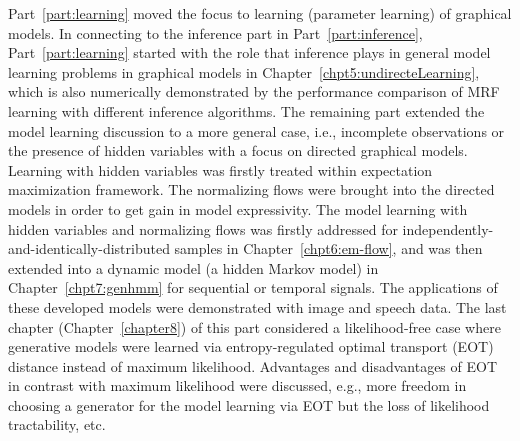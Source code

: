 Part~\ref{part:learning} moved the focus to learning (parameter learning) of graphical models. In connecting to the inference part in Part~\ref{part:inference}, Part~\ref{part:learning} started with the role that inference plays in general model learning problems in graphical models in Chapter~\ref{chpt5:undirecteLearning}, which is also numerically demonstrated by the performance comparison of MRF learning with different inference algorithms. The remaining part extended the model learning discussion to a more general case, i.e., incomplete observations or the presence of hidden variables with a focus on directed graphical models. Learning with hidden variables was firstly treated within expectation maximization framework. The normalizing flows were brought into the directed models in order to get gain in model expressivity. The model learning with hidden variables and normalizing flows was firstly addressed for independently-and-identically-distributed samples in Chapter~\ref{chpt6:em-flow}, and was then extended into a dynamic model (a hidden Markov model) in Chapter~\ref{chpt7:genhmm} for sequential or temporal signals. The applications of these developed models were demonstrated with image and speech data. The last chapter (Chapter~\ref{chapter8}) of this part considered a likelihood-free case where generative models were learned via entropy-regulated optimal transport (EOT) distance instead of maximum likelihood. Advantages and disadvantages of EOT in contrast with maximum likelihood were discussed, e.g., more freedom in choosing a generator for the model learning via EOT but the loss of likelihood tractability, etc.


